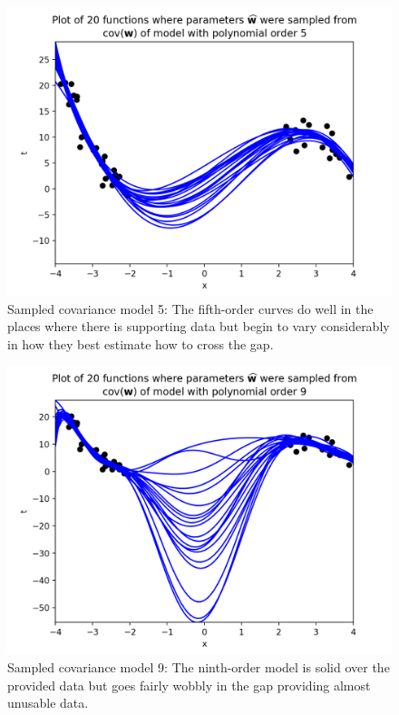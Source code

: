 \documentclass[10pt]{article}
\begin{document}
\begin{itemize}
\begin{figure}[H]
\centering
  \includegraphics[width=\linewidth]{sampled-fns-5.png}
 \caption{Sampled covariance model 5: The fifth-order curves do well in the places where there is supporting data but begin to vary considerably in how they best estimate how to cross the gap.}
\label{label}
\end{figure}

\begin{figure}[H]
\centering
  \includegraphics[width=\linewidth]{sampled-fns-9.png}
 \caption{Sampled covariance model 9: The ninth-order model is solid over the provided data but goes fairly wobbly in the gap providing almost unusable data.}
\label{label}
\end{figure}


\end{itemize}
\end{document}
